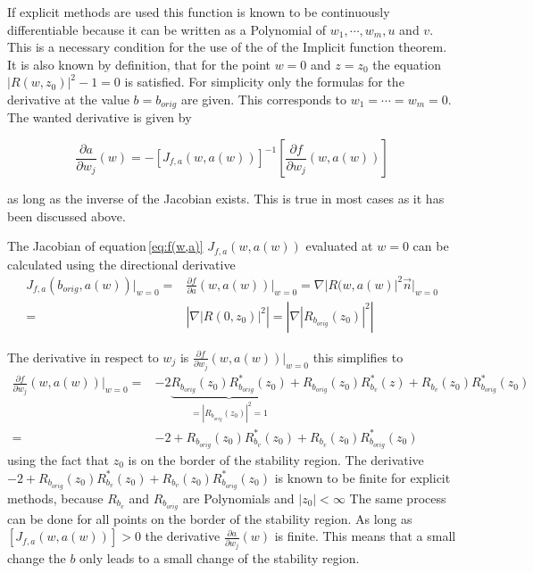 \documentclass{article}
\begin{document}
If explicit methods are used this function is known to be continuously differentiable because it can be written as a Polynomial of $w_1,\cdots,w_m,u$ and $v$. This is a necessary condition for the use of the of the Implicit function theorem. 
It is also known by definition, that for the point $w=0$ and $z = z_0$ the equation $ |R(w,z_0)|^2 -1 = 0 $ is satisfied.
For simplicity only the formulas for the derivative at the value $b = b_{orig}$ are given. This corresponds to $w_1 = \cdots = w_m = 0$.
The wanted derivative  is given by 

\begin{equation}
 \frac{\partial a}{\partial w_j} (w) =
 - \left[ J_{f,a}(w,a(w))  \right] ^{-1} 
   \left[ \frac{\partial f}{\partial w_j}(w,a(w)) \right]
\end{equation}

as long as the inverse of the Jacobian exists. This is true in most cases as it has been discussed above.

The Jacobian of equation\,\ref{eq:f(w,a)} $J_{f,a}(w,a(w))$ evaluated at $w=0$ can be calculated using the directional derivative
\begin{align*}
 J_{f,a}(b_{orig},a(w)) \Big|_{w=0} =& 
 \frac{\partial f}{\partial a} (w,a(w)) \Big|_{w=0} = 
 \nabla |R(w,a(w)|^2 \vec{n} \Big|_{w=0} \\
=& \left| \nabla|R(0,z_0)|^2 \right| = \left| \nabla|R_{b_{orig}}(z_0)|^2 \right|
\end{align*} 

The derivative in respect to $w_j$ is 
$ \frac{\partial f}{\partial w_j}(w,a(w)) \Big|_{w=0}$
this simplifies to 
\begin{align*}\label{eq:derivative_to_b}
 \frac{\partial f}{\partial w_j}(w,a(w)) \Big|_{w=0} =&
- 2 \underbrace{R_{b_{orig}}(z_0)R^*_{b_{orig}}(z_0)}_{=|R_{b_{orig}}(z_0)|^2=1} + R_{b_{orig}}(z_0)R^*_{b_v}(z) + R_{b_v}(z_0)R^*_{b_{orig}}(z_0) \\
=& -2 + R_{b_{orig}}(z_0)R^*_{b_v}(z_0) + R_{b_v}(z_0)R^*_{b_{orig}}(z_0)
\end{align*}
using the fact that $z_0$ is on the border of the stability region.
The derivative $-2 + R_{b_{orig}}(z_0)R^*_{b_v}(z_0) + R_{b_v}(z_0)R^*_{b_{orig}}(z_0)$ is known to be finite for explicit methods, because $R_{b_v}$ and $R_{b_{orig}}$ are Polynomials and $|z_0| < \infty$
The same process can be done for all points on the border of the stability region. 
As long as $\left[ J_{f,a}(w,a(w))  \right] > 0$ the derivative $\frac{\partial a}{\partial w_j} (w)$ is finite. This means that a small change the $b$ only leads to a small change of the stability region.




\printbibliography
\end{document}
